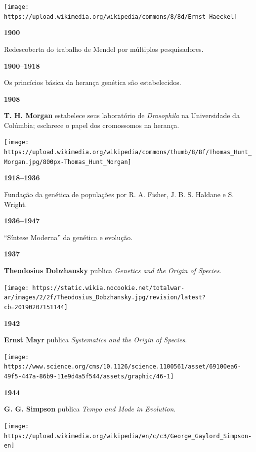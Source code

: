 \documentclass[
]{book}
\begin{document}
\begin{flushleft}\texttt{[image: https://upload.wikimedia.org/wikipedia/commons/8/8d/Ernst\_Haeckel]} \end{flushleft}

\textbf{1900}

Redescoberta do trabalho de Mendel por múltiplos pesquisadores.

\textbf{1900--1918}

Os princícios básica da herança genética são estabelecidos.

\textbf{1908}

\textbf{T. H. Morgan} estabelece seus laboratório de \emph{Drosophila} na Universidade da Colúmbia; esclarece o papel dos cromossomos na herança.

\begin{flushleft}\texttt{[image: https://upload.wikimedia.org/wikipedia/commons/thumb/8/8f/Thomas\_Hunt\_Morgan.jpg/800px-Thomas\_Hunt\_Morgan]} \end{flushleft}

\textbf{1918--1936}

Fundação da genética de populações por R. A. Fisher, J. B. S. Haldane e S. Wright.

\textbf{1936--1947}

``Síntese Moderna'' da genética e evolução.

\textbf{1937}

\textbf{Theodosius Dobzhansky} publica \emph{Genetics and the Origin of Species}.

\begin{flushleft}\texttt{[image: https://static.wikia.nocookie.net/totalwar-ar/images/2/2f/Theodosius\_Dobzhansky.jpg/revision/latest?cb=20190207151144]} \end{flushleft}

\textbf{1942}

\textbf{Ernst Mayr} publica \emph{Systematics and the Origin of Species}.

\begin{flushleft}\texttt{[image: https://www.science.org/cms/10.1126/science.1100561/asset/69100ea6-49f5-447a-86b9-11e9d4a5f544/assets/graphic/46-1]} \end{flushleft}

\textbf{1944}

\textbf{G. G. Simpson} publica \emph{Tempo and Mode in Evolution}.

\begin{flushleft}\texttt{[image: https://upload.wikimedia.org/wikipedia/en/c/c3/George\_Gaylord\_Simpson-en]} \end{flushleft}
\end{document}
